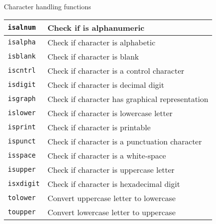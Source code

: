 \documentclass[xcolor={dvipsnames}]{beamer}
\begin{document}
\begin{frame}{Character handling functions}
\begin{tabular}{|l|l|}
\hline
\texttt{isalnum} & Check if is alphanumeric\\ 
 \hline 
\texttt{isalpha} & Check if character is alphabetic\\ 
 \hline 
\texttt{isblank} & Check if character is blank\\ 
 \hline 
\texttt{iscntrl} & Check if character is a control character \\ 
 \hline 
\texttt{isdigit} & Check if character is decimal digit\\ 
 \hline 
\texttt{isgraph} & Check if character has graphical representation\\ 
 \hline 
\texttt{islower} & Check if character is lowercase letter\\ 
 \hline 
\texttt{isprint} & Check if character is printable\\ 
 \hline 
\texttt{ispunct} & Check if character is a punctuation character\\ 
 \hline 
\texttt{isspace} & Check if character is a white-space\\ 
 \hline 
\texttt{isupper} & Check if character is uppercase letter\\ 
 \hline 
\texttt{isxdigit} & Check if character is hexadecimal digit\\ 
 \hline 
\texttt{tolower} & Convert uppercase letter to lowercase\\ 
 \hline 
\texttt{toupper} & Convert lowercase letter to uppercase\\
\hline
\end{tabular}
\end{frame}
\end{document}
